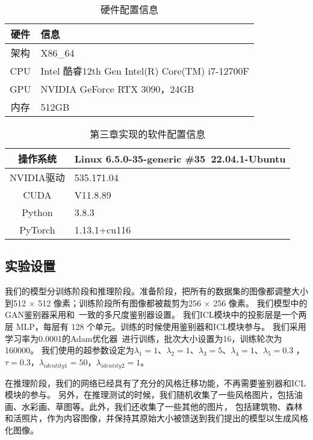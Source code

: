 
\begin{table}[htbp]
    \caption{\label{tab:tab_hardware}硬件配置信息}
    \begin{tabularx}{\linewidth}{c|X<{\centering}}
        \hline
        硬件 & 信息 \\ \hline
        架构 & X86\_64 \\ \hline
        CPU & Intel 酷睿12th Gen Intel(R) Core(TM) i7-12700F \\ \hline
        GPU & NVIDIA GeForce RTX 3090，24GB \\ \hline
        内存 & 512GB \\ \hline
    \end{tabularx}
\end{table}
\begin{table}[htbp]
    \caption{\label{tab:tab_software}第三章实现的软件配置信息}
    \begin{tabularx}{\linewidth}{c|X<{\centering}}
        \hline
        操作系统 & Linux 6.5.0-35-generic \#35~22.04.1-Ubuntu \\ \hline
        NVIDIA驱动 & 535.171.04 \\ \hline
        CUDA & V11.8.89 \\ \hline
        Python & 3.8.3 \\ \hline
        PyTorch & 1.13.1+cu116 \\ \hline
    \end{tabularx}
\end{table}
\subsection{实验设置}
我们的模型分训练阶段和推理阶段。准备阶段，把所有的数据集的图像都调整大小到512 $\times$  512 像素；训练阶段所有图像都被裁剪为256 $\times$ 256 像素。
我们模型中的GAN鉴别器采用和~\cite{wang2018high}一致的多尺度鉴别器设置。
我们ICL模块中的投影层是一个两层 MLP，每层有 128 个单元。训练的时候使用鉴别器和ICL模块参与。
我们采用学习率为0.0001的Adam优化器~\cite{diederik2014adam}进行训练，批次大小设置为16，训练轮次为160000。
我们使用的超参数设定为$\lambda_1=1$、$\lambda_2  =1$、$\lambda_3=5$、$\lambda_4=1$、$\lambda_5=0.3$ ，$\tau=0.3$，$\lambda_{identity1}=50$，$\lambda_{identity2}=1$。
\par 在推理阶段，我们的网络已经具有了充分的风格迁移功能，不再需要鉴别器和ICL模块的参与。
另外，在推理测试的时候，我们随机收集了一些风格图片，包括油画、水彩画、草图等。此外，我们还收集了一些其他的图片，
包括建筑物、森林和活照片，作为内容图像，并保持其原始大小被馈送到我们提出的模型以生成风格化图像。


